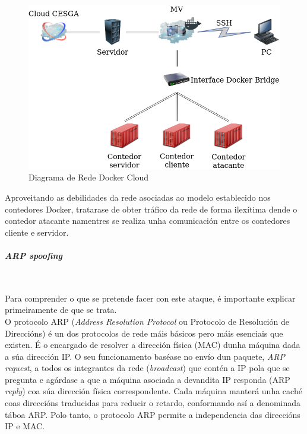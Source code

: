 \begin{figure}
\centerline{\includegraphics[width=15cm]{figuras/DiagramaRedeDockerCloud.png}}
\caption{Diagrama de Rede Docker Cloud}
\label{DiagramaRedeDockerCloud}
\end{figure}

Aproveitando as debilidades da rede asociadas ao modelo establecido nos contedores Docker, tratarase de obter tráfico da rede de forma ilexítima dende o contedor atacante namentres se realiza unha comunicación entre os contedores cliente e servidor.

\paragraph{\textit{ARP spoofing}}~~


Para comprender o que se pretende facer con este ataque, é importante explicar primeiramente de que se trata.\\

O protocolo ARP (\textit{Address Resolution Protocol} ou Protocolo de Resolución de Direccións) é un dos protocolos de rede máis básicos pero máis esenciais que existen. É o encargado de resolver a dirección física (MAC) dunha máquina dada a súa dirección IP. O seu funcionamento baséase no envío dun paquete, \textit{ARP request}, a todos os integrantes da rede (\textit{broadcast}) que contén a IP pola que se pregunta e agárdase a que a máquina asociada a devandita IP responda (ARP \textit{reply}) coa súa dirección física correspondente. Cada máquina manterá unha caché coas direccións traducidas para reducir o retardo, conformando así a denominada táboa ARP. Polo tanto, o protocolo ARP permite a independencia das direccións IP e MAC.\\

